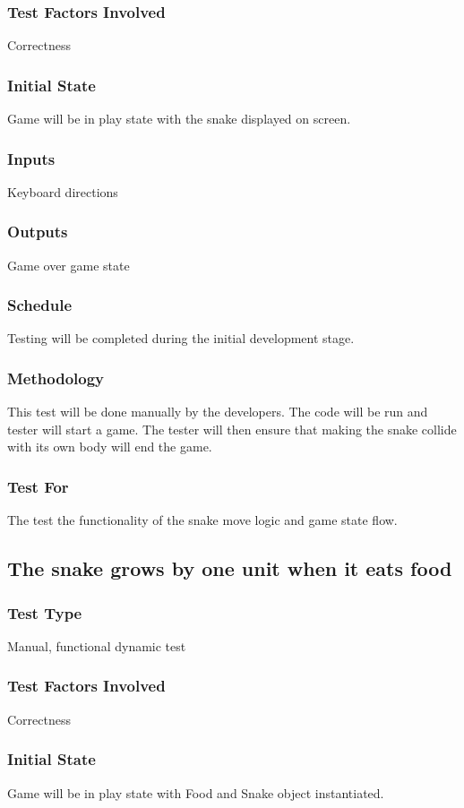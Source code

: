 \documentclass[12pt]{article}
\begin{document}
\subsubsection*{Test Factors Involved}
Correctness
\subsubsection*{Initial State}
Game will be in play state with the snake displayed on screen.
\subsubsection*{Inputs}
Keyboard directions
\subsubsection*{Outputs}
Game over game state
\subsubsection*{Schedule}
Testing will be completed during the initial development stage.
\subsubsection*{Methodology}
This test will be done manually by the developers. The code will be run and tester will start a game. The tester will then ensure that making the snake collide with its own body will end the game.
\subsubsection*{Test For}
The test the functionality of the snake move logic and game state flow. \newline

\noindent
\subsection{The snake grows by one unit when it eats food}
\subsubsection*{Test Type}
Manual, functional dynamic test
\subsubsection*{Test Factors Involved}
Correctness
\subsubsection*{Initial State}
Game will be in play state with Food and Snake object instantiated.
\end{document}
